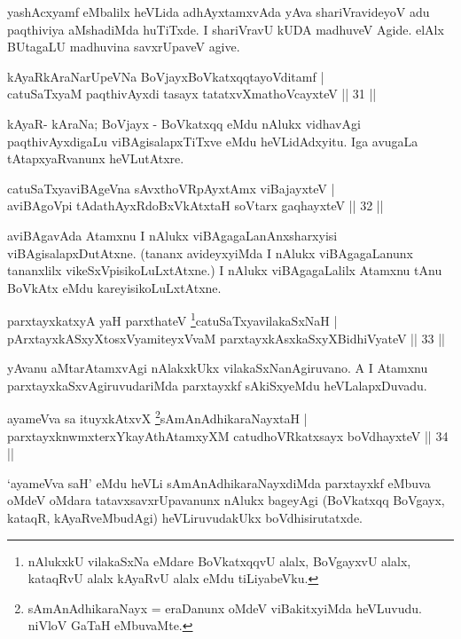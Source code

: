 \begin{artha}
yashAcxyamf eMbalilx heVLida adhAyxtamxvAda yAva shariVravideyoV adu paqthiviya aMshadiMda huTiTxde. I shariVravU kUDA madhuveV Agide. elAlx BUtagaLU madhuvina savxrUpaveV agive. 
\end{artha}
\begin{shl}
kAyaRkAraNarUpeVNa BoVjayxBoVkatxqqtayoVditamf |\\
catuSaTxyaM paqthivAyxdi tasayx tatatxvXmathoVcayxteV \hfill || 31 || 
\end{shl}
\begin{artha}
kAyaR- kAraNa; BoVjayx - BoVkatxqq eMdu nAlukx vidhavAgi paqthivAyxdigaLu viBAgisalapxTiTxve eMdu heVLidAdxyitu. Iga avugaLa tAtapxyaRvanunx heVLutAtxre.
\end{artha}
\begin{shl}
catuSaTxyaviBAgeVna sAvxthoVR\s pAyxtAmx viBajayxteV |\\
aviBAgoV\s pi tAdathAyxRdoBxVkAtx\s taH soV\s tarx gaqhayxteV \hfill || 32 ||
\end{shl}
\begin{artha}
aviBAgavAda Atamxnu I nAlukx viBAgagaLanAnxsharxyisi viBAgisalapxDutAtxne. (tananx avideyxyiMda I nAlukx viBAgagaLanunx tananxlilx vikeSxVpisikoLuLxtAtxne.) I nAlukx viBAgagaLalilx Atamxnu tAnu BoVkAtx eMdu kareyisikoLuLxtAtxne.
\end{artha}


\begin{shl}
parxtayxkatxyA yaH parxthateV \footnote{nAlukxkU vilakaSxNa eMdare BoVkatxqqvU alalx, BoVgayxvU alalx, kataqRvU alalx kAyaRvU alalx eMdu tiLiyabeVku.}catuSaTxyavilakaSxNaH |\\
pArxtayxkASxyXtosxV\s yamiteyxVvaM parxtayxkAsxkaSxyXBidhiVyateV \hfill || 33 ||
\end{shl}

\begin{artha}
yAvanu aMtarAtamxvAgi nAlakxkUkx vilakaSxNanAgiruvano. A I Atamxnu parxtayxkaSxvAgiruvudariMda parxtayxkf sAkiSxyeMdu heVLalapxDuvadu.
\end{artha}


\begin{shl}
ayameVva sa ituyxkAtxvX \footnote{sAmAnAdhikaraNayx = eraDanunx oMdeV viBakitxyiMda
  heVLuvudu. niVloV GaTaH eMbuvaMte.}sAmAnAdhikaraNayxtaH |\\
parxtayxknwmxterxYkayAthAtamxyXM catudhoVRkatxsayx boVdhayxteV \hfill || 34 ||
\end{shl}

\begin{artha}
`ayameVva saH' eMdu heVLi sAmAnAdhikaraNayxdiMda parxtayxkf eMbuva oMdeV oMdara tatavxsavxrUpavanunx nAlukx bageyAgi (BoVkatxqq BoVgayx, kataqR, kAyaRveMbudAgi) heVLiruvudakUkx boVdhisirutatxde.
\end{artha}

